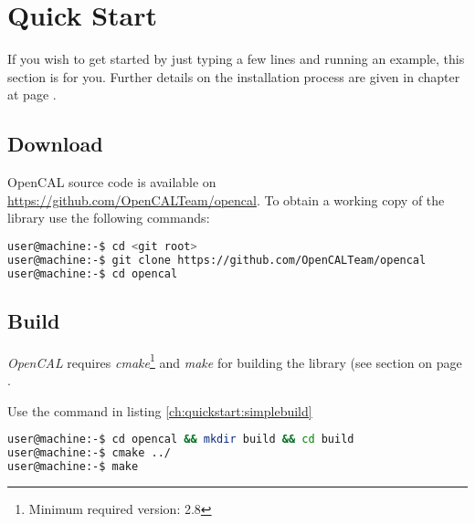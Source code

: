 \chapter{Quick Start}

If you wish to get started by just typing a few lines and running
an example, this section is for you. Further details on
the installation process are given in chapter  at page
\pageref{ch:installation}.

\section{Download}
OpenCAL source code is available on
\url{https://github.com/OpenCALTeam/opencal}. To obtain a working copy of the
library use the following commands:

\begin{lstlisting}[language=bash,caption={OpenCAL download}]
user@machine:-$ cd <git root>
user@machine:-$ git clone https://github.com/OpenCALTeam/opencal
user@machine:-$ cd opencal
\end{lstlisting}

\section{Build}
\textit{OpenCAL} requires \textit{cmake}\footnote{Minimum required version: 2.8}
and \textit{make} for building the library (see section
 on page \pageref{ch:installation:sect:build} .  

Use the command in listing \ref{ch:quickstart:simplebuild}
 \begin{lstlisting}[language=bash,caption={OpenCAL simple build},label={ch:quickstart:simplebuild}]
user@machine:-$ cd opencal && mkdir build && cd build
user@machine:-$ cmake ../
user@machine:-$ make
\end{lstlisting}
